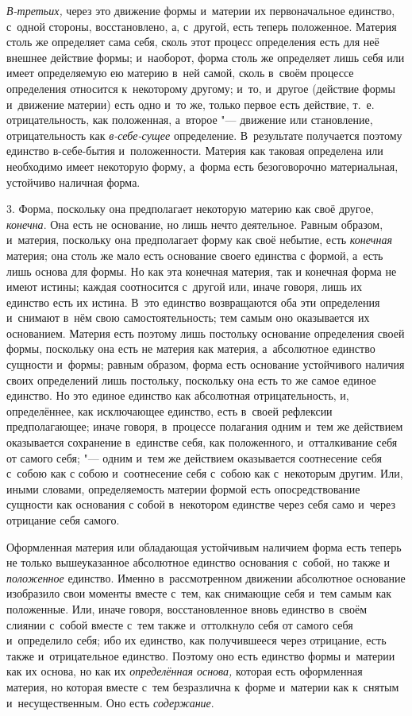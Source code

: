 {\em В-третьих,} через это движение формы и~материи их первоначальное единство,
с~одной стороны, восстановлено, а, с~другой, есть теперь положенное. Материя
столь же определяет сама себя, сколь этот процесс определения есть для неё
внешнее действие формы; и~наоборот, форма столь же определяет лишь себя или
имеет определяемую ею материю в~ней самой, сколь в~своём процессе определения
относится к~некоторому другому; и~то, и~другое (действие формы и~движение
материи) есть одно и~то же, только первое есть действие, т.~е. отрицательность,
как положенная, а~второе "--- движение или становление, отрицательность как
{\em в-себе-сущее} определение. В~результате получается поэтому единство
в-себе-бытия и~положенности. Материя как таковая определена или необходимо
имеет некоторую форму, а~форма есть безоговорочно материальная, устойчиво
наличная форма.

3. Форма, поскольку она предполагает некоторую материю как своё другое,
{\em конечна}. Она есть не основание, но лишь нечто деятельное. Равным образом,
и~материя, поскольку она предполагает форму как своё небытие, есть
{\em конечная} материя; она столь же мало есть основание своего единства с
формой, а~есть лишь основа для формы. Но как эта конечная материя, так и
конечная форма не имеют истины; каждая соотносится с~другой или, иначе говоря,
лишь их единство есть их истина. В~это единство возвращаются оба эти
определения и~снимают в~нём свою самостоятельность; тем самым оно оказывается
их основанием. Материя есть поэтому лишь постольку основание определения своей
формы, поскольку она есть не материя как материя, а~абсолютное единство
сущности и~формы; равным образом, форма есть основание устойчивого наличия
своих определений лишь постольку, поскольку она есть то же самое единое
единство. Но это единое единство как абсолютная отрицательность, и,
определённее, как исключающее единство, есть в~своей рефлексии предполагающее;
иначе говоря, в~процессе полагания одним и~тем же действием оказывается
сохранение в~единстве себя, как положенного, и~отталкивание себя от самого
себя; "--- одним и~тем же действием оказывается соотнесение себя с~собою как с
собою и~соотнесение себя с~собою как с~некоторым другим. Или, иными словами,
определяемость материи формой есть опосредствование сущности как основания с
собой в~некотором единстве через себя само и~через отрицание себя самого.

Оформленная материя или обладающая устойчивым наличием форма есть теперь не
только вышеуказанное абсолютное единство основания с~собой, но также и
{\em положенное} единство. Именно в~рассмотренном движении абсолютное основание
изобразило свои моменты вместе с~тем, как снимающие себя и~тем самым как
положенные. Или, иначе говоря, восстановленное вновь единство в~своём слиянии
с~собой вместе с~тем также и~оттолкнуло себя от самого себя и~определило себя;
ибо их единство, как получившееся через отрицание, есть также и~отрицательное
единство. Поэтому оно есть единство формы и~материи как их основа, но как их
{\em определённая основа,} которая есть оформленная материя, но которая вместе
с~тем безразлична к~форме и~материи как к~снятым и~несущественным. Оно есть
{\em содержание}.

